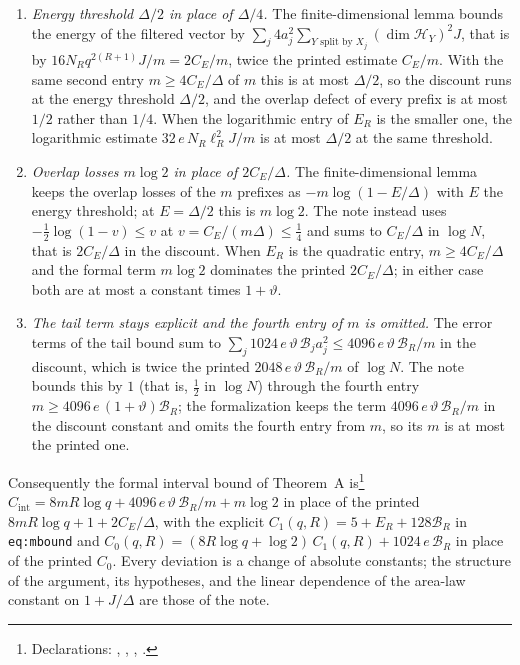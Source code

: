 \documentclass{article}
\begin{document}
\begin{enumerate}
    \item \emph{Energy threshold $\Delta/2$ in place of $\Delta/4$.} The
          finite-dimensional lemma bounds the energy of the filtered vector by
          $\sum_j4a_j^2\sum_{Y\text{ split by }X_j}(\dim\mathcal H_Y)^2J$, that is by
          $16N_Rq^{2(R+1)}J/m=2C_E/m$, twice the printed estimate $C_E/m$. With the
          same second entry $m\ge4C_E/\Delta$ of $m$ this is at most $\Delta/2$, so the
          discount runs at the energy threshold $\Delta/2$, and the overlap defect of
          every prefix is at most $1/2$ rather than $1/4$. When the logarithmic entry
          of $E_R$ is the smaller one, the logarithmic estimate
          $32\,e\,N_R\ell_R^2J/m$ is at most $\Delta/2$ at the same threshold.
    \item \emph{Overlap losses $m\log2$ in place of $2C_E/\Delta$.} The
          finite-dimensional lemma keeps the overlap losses of the $m$ prefixes as
          $-m\log(1-E/\Delta)$ with $E$ the energy threshold; at $E=\Delta/2$ this is
          $m\log2$. The note instead uses $-\frac12\log(1-v)\le v$ at
          $v=C_E/(m\Delta)\le\frac14$ and sums to $C_E/\Delta$ in $\log N$, that is
          $2C_E/\Delta$ in the discount. When $E_R$ is the quadratic entry,
          $m\ge4C_E/\Delta$ and the formal term $m\log2$ dominates the printed
          $2C_E/\Delta$; in either case both are at most a constant times
          $1+\vartheta$.
    \item \emph{The tail term stays explicit and the fourth entry of $m$ is
              omitted.} The error terms of the tail bound sum to
          $\sum_j1024\,e\,\vartheta\,\mathcal B_ja_j^2\le4096\,e\,\vartheta\,\mathcal B_R/m$
          in the discount, which is twice the printed $2048\,e\,\vartheta\,\mathcal B_R/m$
          of $\log N$. The note bounds this by $1$ (that is, $\frac12$ in $\log N$)
          through the fourth entry $m\ge4096\,e\,(1+\vartheta)\mathcal B_R$; the
          formalization keeps the term $4096\,e\,\vartheta\,\mathcal B_R/m$ in the
          discount constant and omits the fourth entry from $m$, so its $m$ is at most
          the printed one.
\end{enumerate}

Consequently the formal interval bound of Theorem~A
is\footnote{Declarations:
    ,
    ,
    ,
    .}
$C_{\mathrm{int}}=8mR\log q+4096\,e\,\vartheta\,\mathcal B_R/m+m\log2$ in
place of the printed $8mR\log q+1+2C_E/\Delta$, with the explicit
$C_1(q,R)=5+E_R+128\mathcal B_R$ in \texttt{eq:mbound} and
$C_0(q,R)=(8R\log q+\log2)\,C_1(q,R)+1024\,e\,\mathcal B_R$ in place of the
printed $C_0$. Every deviation is a change of absolute constants; the
structure of the argument, its hypotheses, and the linear dependence of the
area-law constant on $1+J/\Delta$ are those of the note.
\end{document}
